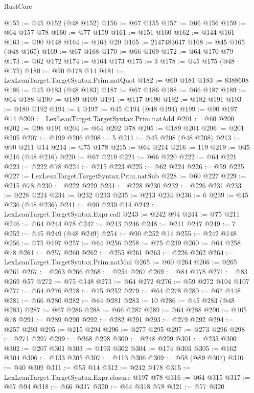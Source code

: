 \begin{lexlean}{RustCore}
\begin{coremodule}
@155 := @45 @152 (@48 @152)
@156 := @67 @155
@157 := @66 @156
@159 := @64 @157 @78
@160 := @77 @159
@161 := @151 @160
@162 := @144 @161
@163 := @90 @148
@164 := @163 @20
@165 := 2147483647
@168 := @45 @165 (@48 @165)
@169 := @67 @168
@170 := @66 @169
@172 := @64 @170 @79
@173 := @62 @172
@174 := @164 @173
@175 := 3
@178 := @45 @175 (@48 @175)
@180 := @90 @178 @14
@181 := LexLeanTarget.TargetSyntax.Prim.natQuot
@182 := @60 @181
@183 := 8388608
@186 := @45 @183 (@48 @183)
@187 := @67 @186
@188 := @66 @187
@189 := @64 @188
@190 := @189 @109
@191 := @117 @190
@192 := @182 @191
@193 := @180 @192
@194 := 4
@197 := @45 @194 (@48 @194)
@199 := @90 @197 @14
@200 := LexLeanTarget.TargetSyntax.Prim.natAdd
@201 := @60 @200
@202 := @98 @191
@204 := @64 @202 @78
@205 := @189 @204
@206 := @201 @205
@207 := @199 @206
@208 := 5
@211 := @45 @208 (@48 @208)
@213 := @90 @211 @14
@214 := @75 @178
@215 := @64 @214
@216 := 119
@219 := @45 @216 (@48 @216)
@220 := @67 @219
@221 := @66 @220
@222 := @64 @221
@223 := @222 @78
@224 := @215 @223
@225 := @62 @224
@226 := @59 @225
@227 := LexLeanTarget.TargetSyntax.Prim.natSub
@228 := @60 @227
@229 := @215 @78
@230 := @222 @229
@231 := @228 @230
@232 := @226 @231
@233 := @228 @224
@234 := @232 @233
@235 := @213 @234
@236 := 6
@239 := @45 @236 (@48 @236)
@241 := @90 @239 @14
@242 := LexLeanTarget.TargetSyntax.Expr.call
@243 := @242 @94
@244 := @75 @211
@246 := @64 @244 @78
@247 := @243 @246
@248 := @241 @247
@249 := 7
@252 := @45 @249 (@48 @249)
@254 := @90 @252 @14
@255 := @242 @148
@256 := @75 @197
@257 := @64 @256
@258 := @75 @239
@260 := @64 @258 @78
@261 := @257 @260
@262 := @255 @261
@263 := @226 @262
@264 := LexLeanTarget.TargetSyntax.Prim.natMul
@265 := @60 @264
@266 := @265 @261
@267 := @263 @266
@268 := @254 @267
@269 := @84 @178
@271 := @83 @269 @57
@272 := @75 @148
@273 := @64 @272
@276 := @59 @272 @104 @107
@277 := @64 @276
@278 := @75 @252
@279 := @64 @278
@280 := @67 @148
@281 := @66 @280
@282 := @64 @281
@283 := 10
@286 := @45 @283 (@48 @283)
@287 := @67 @286
@288 := @66 @287
@289 := @64 @288
@290 := @105 @78
@291 := @289 @290
@292 := @282 @291
@293 := @279 @292
@294 := @257 @293
@295 := @215 @294
@296 := @277 @295
@297 := @273 @296
@298 := @271 @297
@299 := @268 @298
@300 := @248 @299
@301 := @235 @300
@302 := @207 @301
@303 := @193 @302
@304 := @174 @303
@305 := @162 @304
@306 := @133 @305
@307 := @113 @306
@309 := @58 (@89 @307)
@310 := @40 @309
@311 := @55 @14
@312 := @242 @178
@315 := LexLeanTarget.TargetSyntax.Expr.closure @197 @78
@316 := @64 @315
@317 := @67 @94
@318 := @66 @317
@320 := @64 @318 @78
@321 := @77 @320

\end{coremodule}
\end{lexlean}
